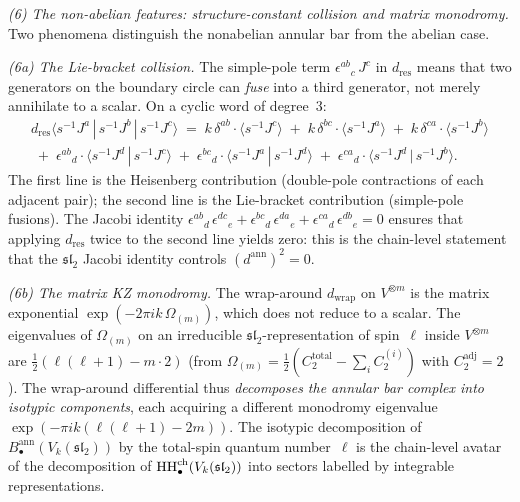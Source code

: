 \begin{computation}
\smallskip
\noindent
\emph{(6) The non-abelian features: structure-constant
collision and matrix monodromy.}
Two phenomena distinguish the nonabelian annular bar
from the abelian case.

\emph{(6a) The Lie-bracket collision.}
The simple-pole term
$\epsilon^{ab}{}_c\, J^c$ in
$d_{\mathrm{res}}$ means that two generators on the
boundary circle can \emph{fuse} into a third generator,
not merely annihilate to a scalar. On a cyclic word
of degree~$3$:
\begin{multline}\label{eq:sl2-ann-dres-3}
d_{\mathrm{res}}
\langle s^{-1}J^a\,|\,s^{-1}J^b\,|\,s^{-1}J^c\rangle
\;=\;
k\,\delta^{ab}\cdot
\langle s^{-1}J^c\rangle
\;+\;
k\,\delta^{bc}\cdot
\langle s^{-1}J^a\rangle
\;+\;
k\,\delta^{ca}\cdot
\langle s^{-1}J^b\rangle \\
\;+\;
\epsilon^{ab}{}_d\cdot
\langle s^{-1}J^d\,|\,s^{-1}J^c\rangle
\;+\;
\epsilon^{bc}{}_d\cdot
\langle s^{-1}J^a\,|\,s^{-1}J^d\rangle
\;+\;
\epsilon^{ca}{}_d\cdot
\langle s^{-1}J^d\,|\,s^{-1}J^b\rangle.
\end{multline}
The first line is the Heisenberg contribution
(double-pole contractions of each adjacent pair);
the second line is the Lie-bracket contribution
(simple-pole fusions). The Jacobi identity
$\epsilon^{ab}{}_d\,\epsilon^{dc}{}_e
+ \epsilon^{bc}{}_d\,\epsilon^{da}{}_e
+ \epsilon^{ca}{}_d\,\epsilon^{db}{}_e = 0$
ensures that applying $d_{\mathrm{res}}$ twice to the
second line yields zero: this is the chain-level
statement that the $\mathfrak{sl}_2$ Jacobi identity
controls $(d^{\mathrm{ann}})^2 = 0$.

\emph{(6b) The matrix KZ monodromy.}
The wrap-around $d_{\mathrm{wrap}}$ on
$V^{\otimes m}$ is the matrix exponential
$\exp(-2\pi ik\,\Omega_{(m)})$, which does not reduce
to a scalar. The eigenvalues of $\Omega_{(m)}$ on an
irreducible $\mathfrak{sl}_2$-representation of
spin~$\ell$ inside $V^{\otimes m}$ are
$\tfrac{1}{2}(\ell(\ell+1) - m \cdot 2)$
(from $\Omega_{(m)} = \tfrac{1}{2}
(C_2^{\mathrm{total}} - \sum_i C_2^{(i)})$
with $C_2^{\mathrm{adj}} = 2$).
The wrap-around differential thus
\emph{decomposes the annular bar complex
into isotypic components}, each acquiring a
different monodromy eigenvalue
$\exp(-\pi ik(\ell(\ell+1) - 2m))$.
The isotypic decomposition of
$B^{\mathrm{ann}}_\bullet(V_k(\mathfrak{sl}_2))$
by the total-spin quantum number~$\ell$ is the
chain-level avatar of the decomposition of
$\operatorname{HH}^{\mathrm{ch}}_\bullet(V_k(\mathfrak{sl}_2))$
into sectors labelled by integrable representations.


\end{computation}
